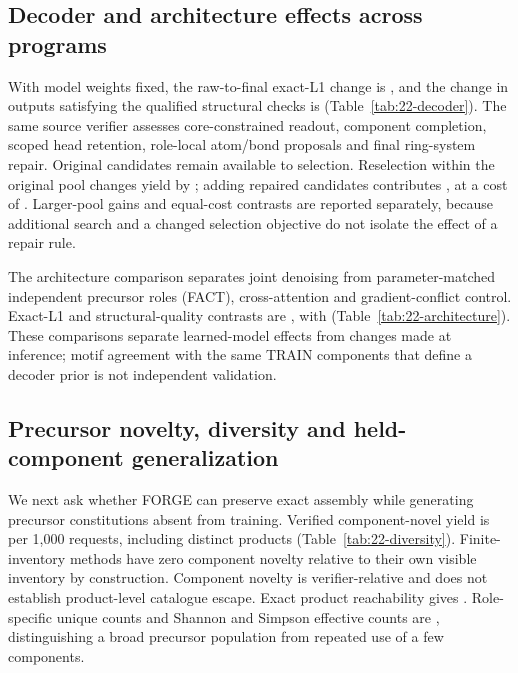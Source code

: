 \subsection{Decoder and architecture effects across programs}
With model weights fixed, the raw-to-final exact-L1 change is
, and the change in outputs satisfying the qualified structural
checks is  (Table~\ref{tab:22-decoder}). The same source
verifier assesses core-constrained readout, component completion, scoped head retention, role-local
atom/bond proposals and final ring-system repair. Original candidates remain available to selection.
Reselection within the original pool changes yield by ;
adding repaired candidates contributes , at a cost of
. Larger-pool gains and equal-cost contrasts
are reported separately, because additional search and a changed selection objective do not isolate
the effect of a repair rule.

The architecture comparison separates joint denoising from parameter-matched independent precursor
roles (FACT), cross-attention and gradient-conflict control. Exact-L1 and structural-quality
contrasts are , with
 (Table~\ref{tab:22-architecture}). These comparisons
separate learned-model effects from changes made at inference; motif agreement with the same TRAIN
components that define a decoder prior is not independent validation.

\subsection{Precursor novelty, diversity and held-component generalization}
We next ask whether FORGE can preserve exact assembly while generating precursor constitutions
absent from training. Verified component-novel yield is  per
1,000 requests, including  distinct products
(Table~\ref{tab:22-diversity}). Finite-inventory methods have zero component novelty relative to
their own visible inventory by construction. Component novelty is verifier-relative and does not
establish product-level catalogue escape. Exact product reachability gives
. Role-specific unique counts and Shannon and Simpson
effective counts are , distinguishing a broad precursor
population from repeated use of a few components.

